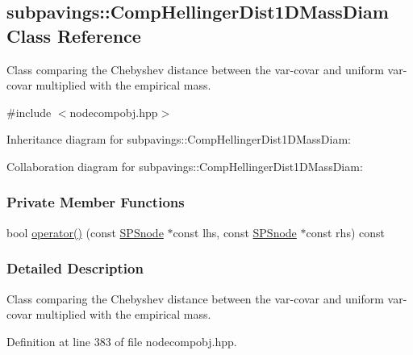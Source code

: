 \hypertarget{classsubpavings_1_1CompHellingerDist1DMassDiam}{\subsection{subpavings\-:\-:\-Comp\-Hellinger\-Dist1\-D\-Mass\-Diam \-Class \-Reference}
\label{classsubpavings_1_1CompHellingerDist1DMassDiam}
}


\-Class comparing the \-Chebyshev distance between the var-\/covar and uniform var-\/covar multiplied with the empirical mass.  




{\ttfamily \#include $<$nodecompobj.\-hpp$>$}



\-Inheritance diagram for subpavings\-:\-:\-Comp\-Hellinger\-Dist1\-D\-Mass\-Diam\-:


\-Collaboration diagram for subpavings\-:\-:\-Comp\-Hellinger\-Dist1\-D\-Mass\-Diam\-:
\subsubsection*{\-Private \-Member \-Functions}
\begin{DoxyCompactItemize}
\item 
bool \hyperlink{classsubpavings_1_1CompHellingerDist1DMassDiam_aa5d0f459f73a7c5abb7c3c47b846a7a7}{operator()} (const \hyperlink{classsubpavings_1_1SPSnode}{\-S\-P\-Snode} $\ast$const lhs, const \hyperlink{classsubpavings_1_1SPSnode}{\-S\-P\-Snode} $\ast$const rhs) const 
\end{DoxyCompactItemize}


\subsubsection{\-Detailed \-Description}
\-Class comparing the \-Chebyshev distance between the var-\/covar and uniform var-\/covar multiplied with the empirical mass. 

\-Definition at line 383 of file nodecompobj.\-hpp.



